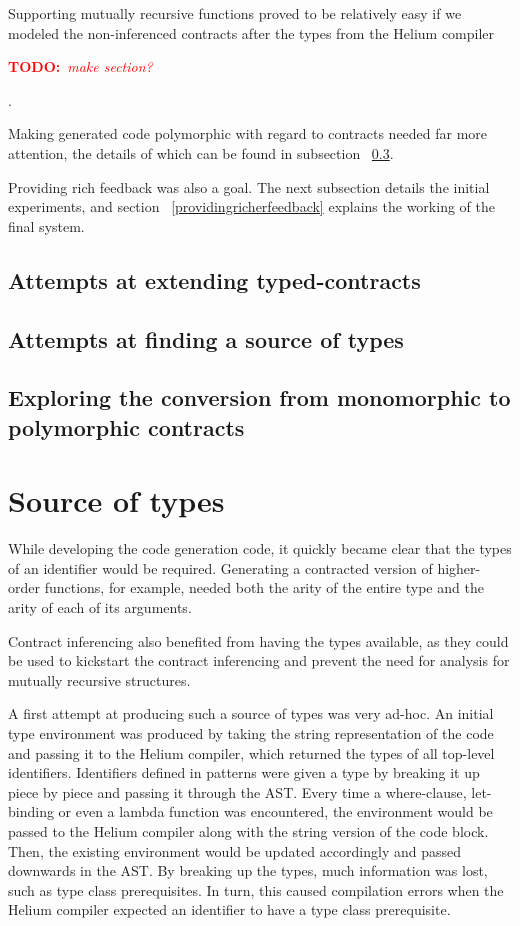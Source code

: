 \documentclass[10pt,a4paper]{article}
\newcommand{\annotate}[3]{
	\begin{scriptsize}
	\textcolor{#1}{\textbf{#2}~\textit{#3}}
	\end{scriptsize}\newline}
\newcommand{\todo}[1]{\annotate{red} {TODO:} {#1}}
\begin{document}
Supporting mutually recursive functions proved to be relatively easy if we modeled the non-inferenced contracts after the types from the Helium compiler \todo{make section?}.

Making generated code polymorphic with regard to contracts needed far more attention, the details of which can be found in subsection ~\ref{monotopolyproblem}.

Providing rich feedback was also a goal. The next subsection details the initial experiments, and section ~\ref{providingricherfeedback} explains the working of the final system.

\subsection{Attempts at extending typed-contracts}
\label{attemptsextendingtypecontracts}

\subsection{Attempts at finding a source of types}
\label{attemptssourceoftypes}

\subsection{Exploring the conversion from monomorphic to polymorphic contracts}
\label{monotopolyproblem}

\section{Source of types}
\label{sourceoftypes}
While developing the code generation code, it quickly became clear that the types of an identifier would be required.
Generating a contracted version of higher-order functions, for example, needed both the arity of the entire type and the arity of each of its arguments.

Contract inferencing also benefited from having the types available, as they could be used to kickstart the contract inferencing and prevent the need for analysis for mutually recursive structures.

A first attempt at producing such a source of types was very ad-hoc.
An initial type environment was produced by taking the string representation of the code and passing it to the Helium compiler, which returned the types of all top-level identifiers.
Identifiers defined in patterns were given a type by breaking it up piece by piece and passing it through the AST.
Every time a where-clause, let-binding or even a lambda function was encountered, the environment would be passed to the Helium compiler along with the string version of the code block.
Then, the existing environment would be updated accordingly and passed downwards in the AST.
By breaking up the types, much information was lost, such as type class prerequisites.
In turn, this caused compilation errors when the Helium compiler expected an identifier to have a type class prerequisite.
\end{document}
